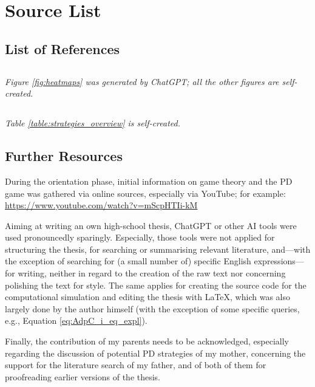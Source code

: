 \documentclass[11pt]{article}
\makeatletter
\renewcommand{\listoffigures}{%
  \subsection*{\listfigurename}%
  \textit{Figure \ref{fig:heatmaps} was generated by ChatGPT; all the other figures are self-created.}
  \@starttoc{lof}%
}
\renewcommand{\listoftables}{%
  \subsection*{\listtablename}%
  \textit{Table \ref{table:strategies_overview} is self-created.}
  \@starttoc{lot}%
}
\makeatother
\begin{document}
\section{Source List} \label{sec:sources}
\subsection*{List of References}
\printbibliography[title={}]

\listoffigures

\listoftables

\subsection*{Further Resources}
During the orientation phase, initial information on game theory and the PD game was gathered via online sources, especially via YouTube; for example:\\
\url{https://www.youtube.com/watch?v=mScpHTIi-kM}

Aiming at writing an own high-school thesis, ChatGPT or other AI tools were used pronouncedly sparingly. 
Especially, those tools were not applied for structuring the thesis, for searching or summarising relevant literature, and---with the exception of searching for (a small number of) specific English expressions---for writing, neither in regard to the creation of the raw text nor concerning polishing the text for style.
The same applies for creating the source code for the computational simulation and editing the thesis with \LaTeX , which was also largely done by the author himself (with the exception of some specific queries, e.g., Equation \ref{eq:AdpC_i_eq_expl}).

Finally, the contribution of my parents needs to be acknowledged, especially regarding the discussion of potential PD strategies of my mother, concerning the support for the literature search of my father, and of both of them for proofreading earlier versions of the thesis.




\newpage

\appendix
\end{document}

